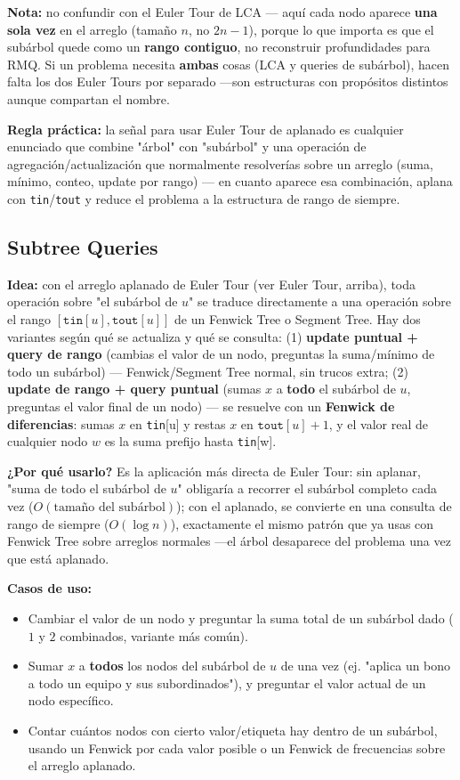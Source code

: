 \documentclass[10pt,a4paper,twocolumn]{article}
\begin{document}
\textbf{Nota:} no confundir con el Euler Tour de LCA — aquí cada nodo
aparece \textbf{una sola vez} en el arreglo (tamaño $n$, no $2n-1$),
porque lo que importa es que el subárbol quede como un \textbf{rango
contiguo}, no reconstruir profundidades para RMQ. Si un problema
necesita \textbf{ambas} cosas (LCA y queries de subárbol), hacen
falta los dos Euler Tours por separado —son estructuras con propósitos
distintos aunque compartan el nombre.

\textbf{Regla práctica:} la señal para usar Euler Tour de aplanado es
cualquier enunciado que combine "árbol" con "subárbol" y una
operación de agregación/actualización que normalmente resolverías
sobre un arreglo (suma, mínimo, conteo, update por rango) — en cuanto
aparece esa combinación, aplana con \texttt{tin}/\texttt{tout} y
reduce el problema a la estructura de rango de siempre.


\subsection{Subtree Queries}

\textbf{Idea:} con el arreglo aplanado de Euler Tour (ver Euler Tour,
arriba), toda operación sobre "el subárbol de $u$" se traduce
directamente a una operación sobre el rango
$[\texttt{tin}[u], \texttt{tout}[u]]$ de un Fenwick Tree o Segment
Tree. Hay dos variantes según qué se actualiza y qué se consulta: (1)
\textbf{update puntual + query de rango} (cambias el valor de un
nodo, preguntas la suma/mínimo de todo un subárbol) — Fenwick/Segment
Tree normal, sin trucos extra; (2) \textbf{update de rango + query
puntual} (sumas $x$ a \textbf{todo} el subárbol de $u$, preguntas el
valor final de un nodo) — se resuelve con un \textbf{Fenwick de
diferencias}: sumas $x$ en \texttt{tin}[u] y restas $x$ en
$\texttt{tout}[u]+1$, y el valor real de cualquier nodo $w$ es la
suma prefijo hasta \texttt{tin}[w].

\textbf{¿Por qué usarlo?} Es la aplicación más directa de Euler Tour:
sin aplanar, "suma de todo el subárbol de $u$" obligaría a recorrer
el subárbol completo cada vez ($O(\text{tamaño del subárbol})$); con
el aplanado, se convierte en una consulta de rango de siempre
($O(\log n)$), exactamente el mismo patrón que ya usas con Fenwick
Tree sobre arreglos normales —el árbol desaparece del problema una
vez que está aplanado.

\textbf{Casos de uso:}

\begin{itemize}
    \item Cambiar el valor de un nodo y preguntar la suma total de un
    subárbol dado ($1$ y $2$ combinados, variante más común).
    \item Sumar $x$ a \textbf{todos} los nodos del subárbol de $u$
    de una vez (ej. "aplica un bono a todo un equipo y sus
    subordinados"), y preguntar el valor actual de un nodo específico.
    \item Contar cuántos nodos con cierto valor/etiqueta hay dentro
    de un subárbol, usando un Fenwick por cada valor posible o un
    Fenwick de frecuencias sobre el arreglo aplanado.
\end{itemize}
\end{document}
